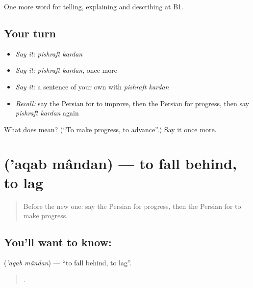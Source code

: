\begin{grammarlens}[title={What you've built}]
One more word for telling, explaining and describing at B1.
\end{grammarlens}

\subsection*{Your turn}
\begin{itemize}
\raggedright
  \item \emph{Say it:} \emph{pishraft kardan}
  \item \emph{Say it:} \emph{pishraft kardan}, once more
  \item \emph{Say it:} a sentence of your own with \emph{pishraft kardan}
  \item \emph{Recall:} say the Persian for to improve, then the Persian for progress, then say \emph{pishraft kardan} again
\end{itemize}

\begin{tcolorbox}[breakable,colback=teal!4,colframe=teal!35!black,title={Before you move on}]
What does   mean? (\textquotedblleft{}To make progress, to advance\textquotedblright{}.) Say it once more.
\end{tcolorbox}
\section[\texorpdfstring{\fa{عقب} \fa{ماندن} ('aqab mândan)}{عقب ماندن ('aqab mândan)}]{  ('aqab mândan) — to fall behind, to lag}

\label{lesson:FA-C374-aqab-mandan}



\begin{quote}
Before the new one: say the Persian for progress, then the Persian for to make progress.
\end{quote}

\subsection*{You'll want to know:  }
\textbf{ } (\emph{'aqab mândan}) — \textquotedblleft{}to fall behind, to lag\textquotedblright{}.

\begin{quote}
       .
\end{quote}

